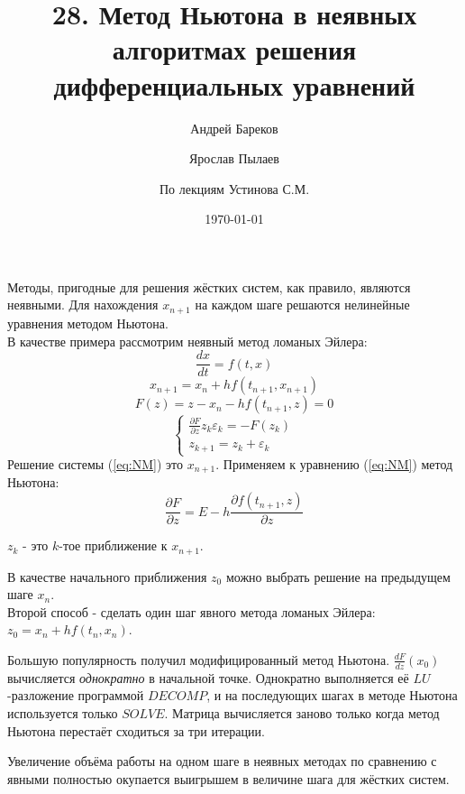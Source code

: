 \documentclass[a4paper,11pt]{article}
\title{28. Метод Ньютона в неявных алгоритмах решения дифференциальных уравнений}
\author{Андрей Бареков \and Ярослав Пылаев \and По лекциям Устинова С.М.}
\date{\today}
\begin{document}
\maketitle
\newpage

\noindent Методы, пригодные для решения жёстких систем, как правило, являются неявными. Для нахождения $x_{n+1}$ на каждом шаге решаются нелинейные уравнения методом Ньютона. \\

\noindent В качестве примера рассмотрим неявный метод ломаных Эйлера:
\begin{equation}
  \frac{dx}{dt} = f(t, x)
\end{equation}
\[x_{n+1} = x_n + hf(t_{n+1}, x_{n+1})\]
\[F(z) = z - x_n - hf(t_{n+1}, z) = 0\]
\begin{equation}
  \begin{cases}
    \frac{\partial F}{\partial z}z_k \varepsilon_k = -F(z_k) \\
    z_{k+1} = z_k + \varepsilon_k
  \end{cases}
  \label{eq:NM}
\end{equation}
Решение системы (\ref{eq:NM}) это $x_{n+1}$. Применяем к уравнению (\ref{eq:NM}) метод Ньютона:
\[\frac{\partial F}{\partial z} = E - h\frac{\partial f(t_{n+1}, z)}{\partial z}\]
\begin{center}
  $z_k$ - это $k$-тое приближение к $x_{n+1}$.
\end{center}

В качестве начального приближения $z_0$ можно выбрать решение на предыдущем шаге $x_n$. \\

Второй способ - сделать один шаг явного метода ломаных Эйлера: $z_0 = x_n + hf(t_n, x_n)$. \\
\begin{importantblock}
  Большую популярность получил модифицированный метод Ньютона. $\frac{dF}{dz}(x_0)$ вычисляется \textit{однократно} в начальной точке. Однократно
    выполняется её $LU$-разложение программой $DECOMP$, и на последующих шагах в методе Ньютона используется только $SOLVE$. Матрица вычисляется заново
    только когда метод Ньютона перестаёт сходиться за три итерации.
\end{importantblock}

\noindent Увеличение объёма работы на одном шаге в неявных методах по сравнению с явными полностью окупается выигрышем в величине шага для жёстких систем.
\end{document}
